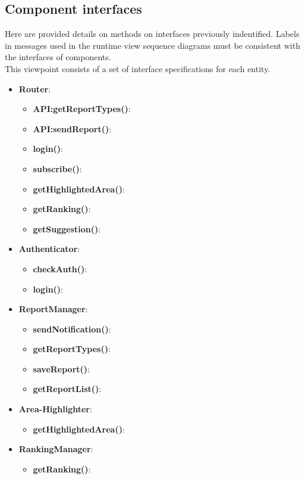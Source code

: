 \documentclass{article}
\begin{document}
\newpage
\subsection{Component interfaces}
Here are provided details on methods on interfaces previously indentified. Labels in messages used in the runtime view sequence diagrams must be consistent with the interfaces of components.
\\
This viewpoint consists of a set of interface specifications for each entity.

\begin{itemize}
	\item \textbf{Router}:
		\begin{itemize}
			\item \textbf{API:getReportTypes()}:
			\item \textbf{API:sendReport()}:
			\item \textbf{login()}:
			\item \textbf{subscribe()}:
			\item \textbf{getHighlightedArea()}:
			\item \textbf{getRanking()}:
			\item \textbf{getSuggestion()}:
		\end{itemize}
	\item \textbf{Authenticator}:
		\begin{itemize}
			\item \textbf{checkAuth()}:
			\item \textbf{login()}:
		\end{itemize}
	\item \textbf{ReportManager}:
		\begin{itemize}
			\item \textbf{sendNotification()}:
			\item \textbf{getReportTypes()}:
			\item \textbf{saveReport()}:
			\item \textbf{getReportList()}:
		\end{itemize}
	\item \textbf{Area-Highlighter}: 
		\begin{itemize}
			\item \textbf{getHighlightedArea()}:
		\end{itemize}
	\item \textbf{RankingManager}: 
		\begin{itemize}
			\item \textbf{getRanking()}:
		\end{itemize}

\end{itemize}
\end{document}
